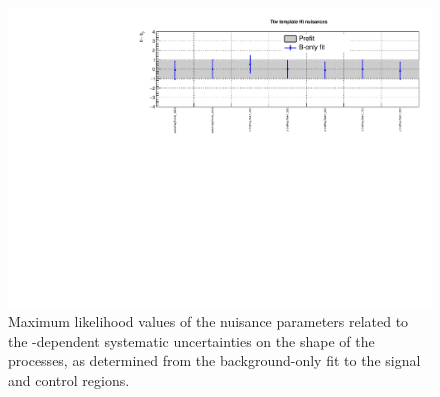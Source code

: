%	

%	

\clearpage
\begin{figure}[h!]
	\centering
	\includegraphics[width=1.\linewidth]{figs/results/nuis/TemplateTtw_ht_nuisances}
	\caption{Maximum likelihood values of the nuisance parameters related to 
	the \scalht-dependent systematic uncertainties on the \mht shape of the 
	\ttw processes, as determined from the background-only fit to the signal 
	and control regions.}
\end{figure}

